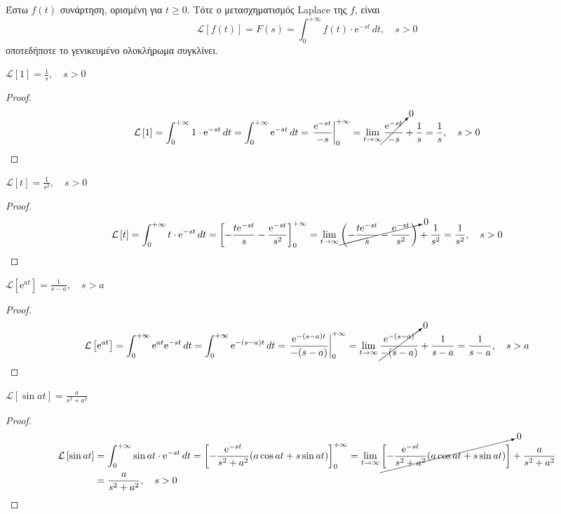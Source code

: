 \begin{dfn}
  Έστω $ f(t) $ συνάρτηση, ορισμένη για $ t \geq 0 $. Τότε ο μετασχηματισμός Laplace 
  της $f$, είναι
  \[
    \mathcal{L} \left[f(t)\right] = F(s) = \int _{0}^{+\infty} f(t)\cdot \mathrm{e}^{-st} 
    \,{dt}, \quad s>0
  \] 
  οποτεδήποτε το γενικευμένο ολοκλήρωμα συγκλίνει.
\end{dfn}

\begin{example}
  $ \mathcal{L}\left[1\right] = \frac{1}{s}, \quad s > 0 $
\end{example}
\begin{proof}
  \[
    \mathcal{L}\left[1\right] = \int_{0}^{+\infty} 1\cdot \mathrm{e}^{-st} \,{dt} =  
    \int_{0}^{+\infty} \mathrm{e}^{-st} \,{dt} = \eval{\frac{\mathrm{e}^{-st}}{-s}}
    _{0}^{+\infty} = \lim_{t \to \infty} \cancelto{0}{\frac{\mathrm{e}^{-st}}{-s}} 
    + \frac{1}{s} = \frac{1}{s} , \quad s>0 
   \] 
\end{proof}

\begin{example}
  $ \mathcal{L}\left[t\right] = \frac{1}{s^{2}}, \quad s>0 $
\end{example}
\begin{proof}
  \[
    \mathcal{L}\left[t\right] = \int_{0}^{+\infty} t \cdot \mathrm{e}^{-st} \,{dt} = 
    \left[-\frac{t \mathrm{e}^{-st}}{s} - \frac{\mathrm{e}^{-st}}{s^{2}}\right]
    _{0}^{+\infty} = \lim_{t \to \infty} 
    \cancelto{0}{\left(- \frac{t\mathrm{e}^{-st}}{s} -
    \frac{\mathrm{e}^{-st}}{s^{2}}\right)} + \frac{1}{s^{2}} = \frac{1}{s^{2}} , 
    \quad s>0
   \] 
\end{proof}

\begin{example}
  $ \mathcal{L}\left[\mathrm{e}^{at}\right] = \frac{1}{s-a}, \quad s > a $ 
  \begin{proof}
    \[
      \mathcal{L}\left[\mathrm{e}^{at}\right] = \int_{0}^{+\infty} \mathrm{e}^{at} 
      \mathrm{e}^{-st} \,{dt} = \int_{0}^{+\infty} \mathrm{e}^{-(s-a)t} \,{dt} =
      \eval{\frac{\mathrm{e}^{-(s-a)t}}{-(s-a)}} _{0}^{+\infty} = 
      \lim_{t \to \infty} \cancelto{0}{\frac{\mathrm{e}^{-(s-a)}}{-(s-a)}}
      + \frac{1}{s-a} = \frac{1}{s-a}, \quad s > a
    \]
  \end{proof}
\end{example}

\begin{example}
  $ \mathcal{L}\left[\sin{at}\right] = \frac{a}{s^{2}+a^{2}} $
\end{example}
\begin{proof}
  \begin{align*}
    \mathcal{L}\left[\sin{at}\right] &= \int_{0}^{+\infty} \sin{at} \cdot
    \mathrm{e}^{-st} \,{dt} = \left[- \frac{\mathrm{e}^{-st}}{s^{2}+a^{2}} 
    (a \cos{at} + s \sin{at})\right] _{0}^{+\infty} = \lim_{t \to \infty} 
    \cancelto{0}{\left[- \frac{\mathrm{e}^{-st}}{s^{2}+a^{2}} (a \cos{at} + s
    \sin{at})\right]} + \frac{a}{s^{2}+a^{2}} \\
                                     &= \frac{a}{s^{2}+a^{2}} , \quad s>0
  \end{align*} 
\end{proof}


